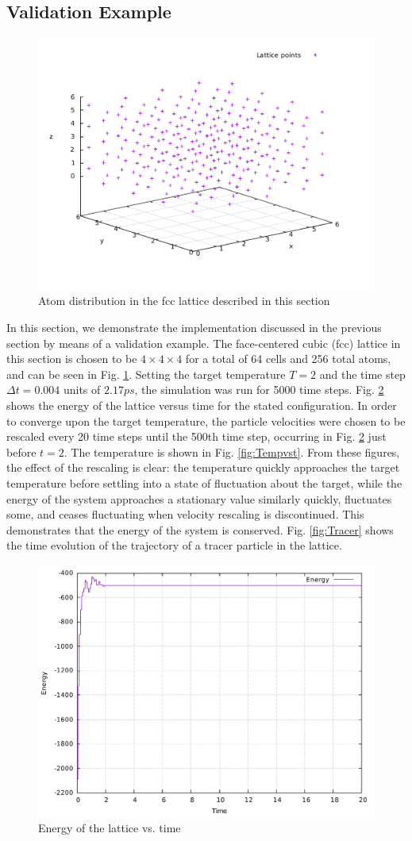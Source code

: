 \documentclass[10pt,a4paper]{article}
\begin{document}
 \subsection{Validation Example}
  \begin{figure}[ht!]
  \centering
  \includegraphics[width=0.6\linewidth]{figs/lattice.pdf}
  \caption{Atom distribution in the fcc lattice described in this section}
  \label{fig:Lattice}
 \end{figure}
 In this section, we demonstrate the implementation discussed in the previous section by means of a validation example. The face-centered cubic (fcc) lattice in this section is chosen to be $4 \times 4 \times 4$ for a total of 64 cells and 256 total atoms, and can be seen in Fig. \ref{fig:Lattice}. Setting the target temperature $T=2$ and the time step $\Delta t = 0.004$ units of $2.17 ps$, the simulation was run for 5000 time steps. Fig. \ref{fig:Evst} shows the energy of the lattice versus time for the stated configuration. In order to converge upon the target temperature, the particle velocities were chosen to be rescaled every 20 time steps until the 500th time step, occurring in Fig. \ref{fig:Evst} just before $t=2$. The temperature is shown in Fig. \ref{fig:Tempvst}. From these figures, the effect of the rescaling is clear: the temperature quickly approaches the target temperature before settling into a state of fluctuation about the target, while the energy of the system approaches a stationary value similarly quickly, fluctuates some, and ceases fluctuating when velocity rescaling is discontinued. This demonstrates that the energy of the system is conserved. Fig. \ref{fig:Tracer} shows the time evolution of the trajectory of a tracer particle in the lattice.
 \begin{figure}
  \centering
  \includegraphics[width=0.6\linewidth]{figs/energyVsTime.pdf}
  \caption{Energy of the lattice vs. time}
  \label{fig:Evst}
 \end{figure}
 
\end{document}
